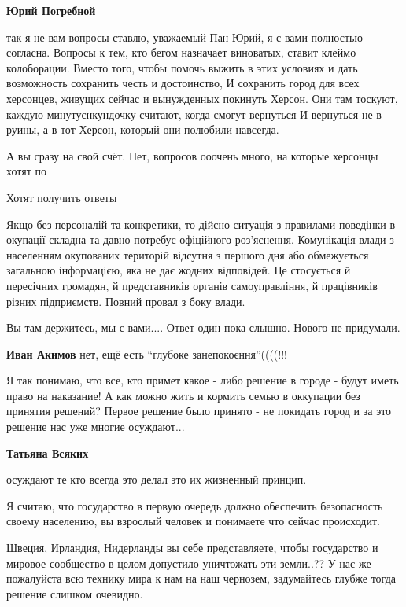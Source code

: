 \begin{itemize}
\begin{itemize}
\textbf{Юрий Погребной} 

так я не вам вопросы ставлю, уважаемый Пан Юрий, я с вами полностью
согласна. Вопросы к тем, кто бегом назначает виноватых, ставит клеймо
колоборации. Вместо того, чтобы помочь выжить в этих условиях и дать возможность
сохранить честь и достоинство, И сохранить город для всех херсонцев, живущих
сейчас и вынужденных покинуть Херсон. Они там тоскуют, каждую минутуснкундочку
считают, когда смогут вернуться И вернуться не в руины, а в тот Херсон, который
они полюбили навсегда.


А вы сразу на свой счёт. Нет, вопросов ооочень много, на которые херсонцы хотят
по

Хотят получить ответы
\end{itemize} %


Якщо без персоналій та конкретики, то дійсно ситуація з правилами поведінки в
окупації складна та давно потребує офіційного роз'яснення. Комунікація влади з
населенням окупованих територій відсутня з першого дня або обмежується
загальною інформацією, яка не дає жодних відповідей. Це стосується й пересічних
громадян, й представників органів самоуправління, й працівників різних
підприємств.  Повний провал з боку влади.

Вы там держитесь, мы с вами.... Ответ один пока слышно. Нового не придумали.

\textbf{Иван Акимов} нет, ещё есть \enquote{глубоке занепокоєння}((((!!!


Я так понимаю, что все, кто примет какое - либо решение в городе - будут иметь
право на наказание! А как можно жить и кормить семью в оккупации без принятия
решений? Первое решение было принято - не покидать город и за это решение нас
уже многие осуждают...

\begin{itemize} %
\textbf{Татьяна Всяких} 

осуждают те кто всегда это делал это их жизненный принцип.

Я считаю, что государство в первую очередь должно обеспечить безопасность
своему населению, вы взрослый человек и понимаете что сейчас происходит.

Швеция, Ирландия, Нидерланды вы себе представляете, чтобы государство и мировое
сообщество в целом допустило уничтожать эти земли..?? У нас же пожалуйста всю
технику мира к нам на наш чернозем, задумайтесь глубже тогда решение слишком
очевидно.


\end{itemize}
\end{itemize}
